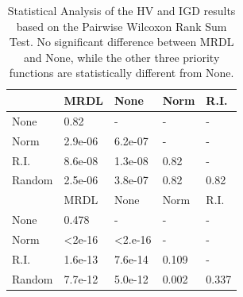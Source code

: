 \begin{table}[!t]
	\begin{tabular}{lllll}
		\hline
		\rowcolor[gray]{.7} \multicolumn{1}{|l|}{\textbf{HV}}  & \multicolumn{1}{|l|}{MRDL} & \multicolumn{1}{l|}{None} & \multicolumn{1}{l|}{Norm} & \multicolumn{1}{l|}{R.I.} \\ \hline \hline \hline
		None                      & 0.82                      & -                         & -                         & -                         \\
		\rowcolor[gray]{.95}Norm                      & 2.9e-06                   & 6.2e-07                   & -                         & -                         \\
		R.I.                      & 8.6e-08                   & 1.3e-08                   & 0.82                      & -                         \\
		\rowcolor[gray]{.95}Random                    & 2.5e-06                   & 3.8e-07                   & 0.82                      & 0.82                      \\ \hline \hline \hline
		\rowcolor[gray]{.7} \multicolumn{1}{|l|}{\textbf{IGD}} & \multicolumn{1}{|l|}{MRDL} & \multicolumn{1}{l|}{None} & \multicolumn{1}{l|}{Norm} & \multicolumn{1}{l|}{R.I.} \\ \hline \hline \hline
		None                      & 0.478                     & -                         & -                         & -                         \\
		\rowcolor[gray]{.95}Norm                      & \textless 2e-16           & \textless 2.e-16          & -                         & -                         \\
		R.I.                      & 1.6e-13                   & 7.6e-14                   & 0.109                     & -                         \\
		\rowcolor[gray]{.95}Random                    & 7.7e-12                   & 5.0e-12                   & 0.002                     & 0.337
	\end{tabular}
	\caption{Statistical Analysis of the HV and IGD results based on the Pairwise Wilcoxon Rank Sum Test. No significant difference between MRDL and None, while the other three priority functions are statistically different from None.\\
	}
	\label{statistics}
\end{table}



